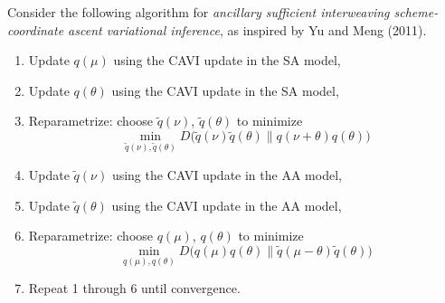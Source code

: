 \documentclass{article}
\begin{document}
Consider the following algorithm for {\sl ancillary sufficient interweaving scheme-coordinate ascent variational inference}, as inspired by Yu and Meng (2011).
\begin{enumerate}
\item Update $q(\mu)$ using the CAVI update in the SA model,
\item Update $q(\theta)$ using the CAVI update in the SA model,
\item Reparametrize: choose $\widetilde q(\nu)$, $\widetilde q(\theta)$ to minimize
$$
\min_{\widetilde q(\nu),\widetilde q(\theta)} D\bigg(\widetilde q(\nu)\widetilde q(\theta)\bigg\|q(\nu+\theta)q(\theta)\bigg)
$$
\item Update $\widetilde q(\nu)$ using the CAVI update in the AA model,
\item Update $\widetilde q(\theta)$ using the CAVI update in the AA model,
\item Reparametrize: choose $q(\mu)$, $q(\theta)$ to minimize
$$
\min_{q(\mu),q(\theta)} D\bigg(q(\mu)q(\theta)\bigg\|\widetilde q(\mu-\theta)\widetilde q(\theta)\bigg)
$$
\item Repeat 1 through 6 until convergence.
\end{enumerate}
\end{document}
